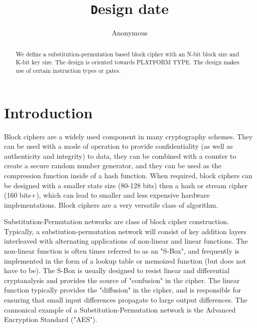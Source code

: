 \documentclass[preprint]{iacrtrans}
\author{Anonymous\inst{1}}
\institute{City, State \email{address@provider.com}}
\title[\texttt Design date]{\texttt Design date}
\begin{document}
\maketitle


\begin{abstract}
  We define a substitution-permutation based block cipher with an N-bit block size and K-bit key size. The design is oriented towards PLATFORM TYPE. The design makes use of certain instruction types or gates. \\ 
\end{abstract}

\todototoc
\listoftodos

\section{Introduction}
 Block ciphers are a widely used component in many cryptography schemes. They can be used with a mode of operation to provide confidentiality (as well as authenticity and integrity) to data, they can be combined with a counter to create a secure random number generator, and they can be used as the compression function inside of a hash function. When required, block ciphers can be designed with a smaller state size (80-128 bits) then a hash or stream cipher (160 bits+), which can lead to smaller and less expensive hardware implementations. Block ciphers are a very versatile class of algorithm.

Substitution-Permutation networks are class of block cipher construction. Typically, a substiution-permutation network will consist of key addition layers interleaved with alternating applications of non-linear and linear functions. The non-linear function is often times referred to as an "S-Box", and frequently is implemented in the form of a lookup table or memoized function (but does not have to be). The S-Box is usually designed to resist linear and differential cryptanalysis and provides the source of "confusion" in the cipher. The linear function typically provides the "diffusion" in the cipher, and is responsible for ensuring that small input differences propagate to large output differences. The cannonical example of a Substitution-Permutation network is the Advanced Encryption Standard ("AES").
\end{document}
